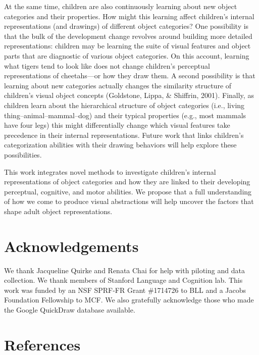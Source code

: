 \documentclass[10pt, letterpaper]{article}
\begin{document}
At the same time, children are also continuously learning about new
object categories and their properties. How might this learning affect
children's internal representations (and drawings) of different object
categories? One possibility is that the bulk of the development change
revolves around building more detailed representations: children may be
learning the suite of visual features and object parts that are
diagnostic of various object categories. On this account, learning what
tigers tend to look like does not change children's perceptual
representations of cheetahs---or how they draw them. A second
possibility is that learning about new categories actually changes the
similarity structure of children's visual object concepts (Goldstone,
Lippa, \& Shiffrin, 2001). Finally, as children learn about the
hierarchical structure of object categories (i.e., living
thing--animal--mammal--dog) and their typical properties (e.g., most
mammals have four legs) this might differentially change which visual
features take precedence in their internal representations. Future work
that links children's categorization abilities with their drawing
behaviors will help explore these possibilities.

This work integrates novel methods to investigate children's internal
representations of object categories and how they are linked to their
developing perceptual, cognitive, and motor abilities. We propose that a
full understanding of how we come to produce visual abstractions will
help uncover the factors that shape adult object representations.

\clearpage

\section{Acknowledgements}\label{acknowledgements}

We thank Jacqueline Quirke and Renata Chai for help with piloting and
data collection. We thank members of Stanford Language and Cognition
lab. This work was funded by an NSF SPRF-FR Grant \#1714726 to BLL and a
Jacobs Foundation Fellowship to MCF. We also gratefully acknowledge
those who made the Google QuickDraw database available.

\section{References}\label{references}

\setlength{\parindent}{-0.1in} \setlength{\leftskip}{0.125in} \noindent
\end{document}

